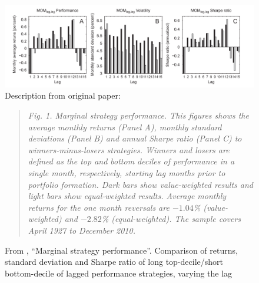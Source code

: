 \begin{figure}
  \caption{From \textcite{Novy-Marx2012}, ``Marginal strategy performance''. Comparison of returns, standard deviation and Sharpe ratio of long top-decile/short bottom-decile of lagged performance strategies, varying the lag}
  \label{fig:NovyMarx2012_Fig1}
  \includegraphics[width=\linewidth]{Figures/NovyMarx2012_Fig1_better.png}
  Description from original paper:
  \begin{quote}
  \textit{Fig. 1. Marginal strategy performance. This figures shows the average monthly returns (Panel A), monthly standard deviations (Panel B) and annual Sharpe ratio (Panel C) to winners-minus-losers strategies. Winners and losers are defined as the top and bottom deciles of performance in a single month, respectively, starting lag months prior to portfolio formation. Dark bars show value-weighted results and light bars show equal-weighted results. Average monthly returns for the one month reversals are $-1.04$\% (value-weighted) and $-2.82$\% (equal-weighted). The sample covers April 1927 to December 2010.}  
  \end{quote}
\end{figure}

